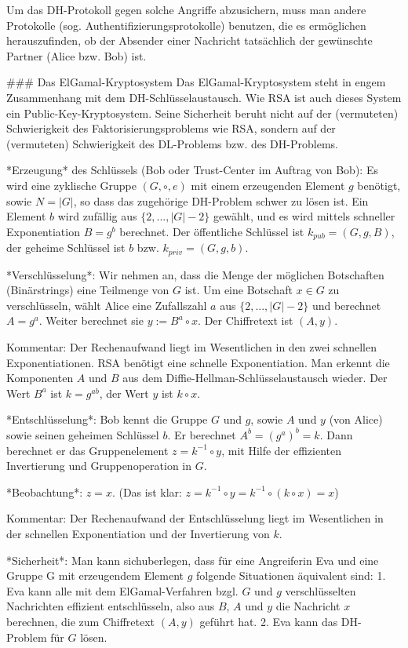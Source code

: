 \documentclass[a4paper]{article}
\begin{document}
\begin{multicols}{3}
{{{{Um das DH-Protokoll gegen solche Angriffe abzusichern, muss man andere Protokolle (sog. Authentifizierungsprotokolle) benutzen, die es ermöglichen herauszufinden, ob der Absender einer Nachricht tatsächlich der gewünschte Partner (Alice bzw. Bob) ist.

### Das ElGamal-Kryptosystem
Das ElGamal-Kryptosystem steht in engem Zusammenhang mit dem DH-Schlüsselaustausch. Wie RSA ist auch dieses System ein Public-Key-Kryptosystem. Seine Sicherheit beruht nicht auf der (vermuteten) Schwierigkeit des Faktorisierungsproblems wie RSA, sondern auf der (vermuteten) Schwierigkeit des DL-Problems bzw. des DH-Problems.

*Erzeugung* des Schlüssels (Bob oder Trust-Center im Auftrag von Bob): Es wird eine zyklische Gruppe $(G,\circ,e)$ mit einem erzeugenden Element $g$ benötigt, sowie $N=|G|$, so dass das zugehörige DH-Problem schwer zu lösen ist. Ein Element $b$ wird zufällig aus $\{2 ,...,|G|-2\}$ gewählt, und es wird mittels schneller Exponentiation $B=g^b$ berechnet. Der öffentliche Schlüssel ist $k_{pub}= (G,g,B)$, der geheime Schlüssel ist $b$ bzw. $k_{priv}=(G,g,b)$.

*Verschlüsselung*: Wir nehmen an, dass die Menge der möglichen Botschaften (Binärstrings) eine Teilmenge von $G$ ist. Um eine Botschaft $x\in G$ zu verschlüsseln, wählt Alice eine Zufallszahl $a$ aus $\{2,...,|G|-2\}$ und berechnet $A=g^a$. Weiter berechnet sie $y:=B^a \circ x$. Der Chiffretext ist $(A,y)$.

Kommentar: Der Rechenaufwand liegt im Wesentlichen in den zwei schnellen Exponentiationen. RSA benötigt eine schnelle Exponentiation. Man erkennt die Komponenten $A$ und $B$ aus dem Diffie-Hellman-Schlüsselaustausch wieder. Der Wert $B^a$ ist $k=g^{ab}$, der Wert $y$ ist $k\circ x$.

*Entschlüsselung*: Bob kennt die Gruppe $G$ und $g$, sowie $A$ und $y$ (von Alice) sowie seinen geheimen Schlüssel $b$. Er berechnet $A^b= (g^a)^b=k$. Dann berechnet er das Gruppenelement $z=k^{-1}\circ y$, mit Hilfe der effizienten Invertierung und Gruppenoperation in $G$.

*Beobachtung*: $z=x$. (Das ist klar: $z=k^{-1}\circ y=k^{-1}\circ(k\circ x) =x$)

Kommentar: Der Rechenaufwand der Entschlüsselung liegt im Wesentlichen in der schnellen Exponentiation und der Invertierung von $k$.

*Sicherheit*: Man kann sichuberlegen, dass für eine Angreiferin Eva und eine Gruppe G mit erzeugendem Element $g$ folgende Situationen äquivalent sind:
1. Eva kann alle mit dem ElGamal-Verfahren bzgl. $G$ und $g$ verschlüsselten Nachrichten effizient entschlüsseln, also aus $B$, $A$ und $y$ die Nachricht $x$ berechnen, die zum Chiffretext $(A,y)$ geführt hat.
2. Eva kann das DH-Problem für $G$ lösen.

}}}}
\end{multicols}
\end{document}
